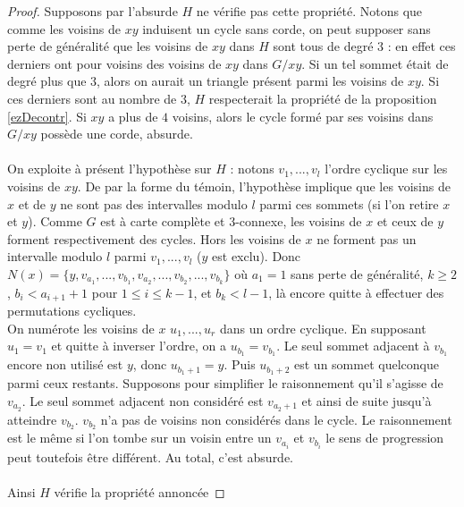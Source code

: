 \documentclass{scrartcl}
\begin{document}
\begin{flushleft}
\begin{proof}
    Supposons par l'absurde $H$ ne vérifie pas cette propriété. Notons que comme les voisins de $xy$
    induisent un cycle sans corde, on peut supposer sans perte de généralité que les voisins de $xy$ dans $H$
    sont tous de degré $3$ : en effet ces derniers ont pour voisins des voisins de $xy$ dans $G / xy$.
    Si un tel sommet était de degré plus que $3$, alors on aurait un triangle présent parmi les voisins de $xy$.
    Si ces derniers sont au nombre de $3$, $H$ respecterait la propriété de la proposition \ref{ezDecontr}.
    Si $xy$ a plus de $4$ voisins, alors le cycle formé par ses voisins dans $G / xy$ possède une corde, absurde.
    \\~\\
    On exploite à présent l'hypothèse sur $H$ : notons $v_1, ..., v_l$ l'ordre cyclique sur les voisins de $xy$.
    De par la forme du témoin, l'hypothèse implique que les voisins de $x$ et de $y$ ne sont pas des intervalles
    modulo $l$ parmi ces sommets (si l'on retire $x$ et $y$). Comme $G$ est à carte complète et $3$-connexe, les voisins de $x$
    et ceux de $y$ forment respectivement des cycles. Hors les voisins de $x$ ne forment pas un intervalle modulo $l$ parmi
    $v_1, ..., v_l$ ($y$ est exclu). Donc $N(x) = \{y, v_{a_1}, ..., v_{b_1}, v_{a_2}, ..., v_{b_2}, ..., v_{b_k}\}$
    où $a_1 = 1$ sans perte de généralité, $k \geq 2$, $b_i < a_{i+1} + 1$ pour $1 \leq i \leq k-1$, et $b_k < l-1$, là encore quitte à effectuer
    des permutations cycliques.\\
    On numérote les voisins de $x$ $u_1, ..., u_r$ dans un ordre cyclique. En supposant $u_1 = v_1$ et quitte à inverser l'ordre,
    on a $u_{b_1} = v_{b_1}$. Le seul sommet adjacent à $v_{b_1}$ encore non utilisé est $y$, donc $u_{b_1 + 1} = y$. Puis
    $u_{b_1 + 2}$ est un sommet quelconque parmi ceux restants. Supposons pour simplifier le raisonnement qu'il s'agisse de $v_{a_2}$.
    Le seul sommet adjacent non considéré est $v_{a_2 + 1}$ et ainsi de suite jusqu'à atteindre $v_{b_2}$. $v_{b_2}$ n'a pas de voisins
    non considérés dans le cycle. Le raisonnement est le même si l'on tombe sur un voisin entre un $v_{a_i}$ et $v_{b_i}$ le sens de
    progression peut toutefois être différent. Au total, c'est absurde.
    \\~\\
    Ainsi $H$ vérifie la propriété annoncée
\end{proof}




\end{flushleft}
\end{document}
